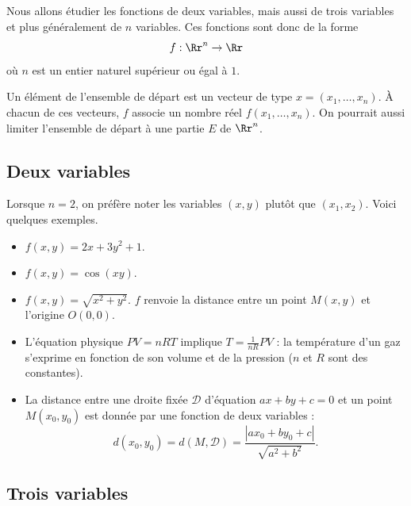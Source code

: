 \documentclass[11pt,class=report,crop=false]{standalone}
\begin{document}
Nous allons étudier les fonctions de deux variables, mais aussi de trois variables et plus généralement de $n$ variables.
Ces fonctions sont donc de la forme 
$$f : \Rr^n \rightarrow \Rr$$
où $n$ est un entier naturel supérieur ou égal à $1$. 


Un élément de l'ensemble de départ est un vecteur de type  $x = (x_1,\ldots,x_n)$. À chacun de ces vecteurs, $f$ associe un nombre réel $f(x_1,\ldots,x_n)$. On pourrait aussi limiter l'ensemble de départ à une partie $E$ de $ \Rr^n$.



\subsection{Deux variables}

Lorsque $n=2$, on préfère noter les variables $(x,y)$ plutôt que $(x_1,x_2)$.
Voici quelques exemples.
\begin{exemple}
\sauteligne
\begin{itemize}
  \item $f(x,y) = 2x+3y^2+1$.
  \item $f(x,y) = \cos(xy)$.
  \item $f(x,y) = \sqrt{x^2+y^2}$. $f$ renvoie la distance entre un point $M(x,y)$ et l'origine $O(0,0)$.
  
  
  \item L'équation physique $PV=nRT$ implique $T = \frac{1}{nR}PV$ :
  la température d'un gaz s'exprime en fonction de son volume et de la pression ($n$ et $R$ sont des constantes).
  \item La distance entre une droite fixée $\mathcal{D}$ d'équation $ax+by+c=0$ et un point $M(x_0,y_0)$ est donnée par une fonction de deux variables : $$d(x_0,y_0) = d(M,\mathcal{D}) = \frac{|ax_0+by_0+c|}{\sqrt{a^2+b^2}}.$$

  
  
\end{itemize}
\end{exemple}


\subsection{Trois variables}
\end{document}

